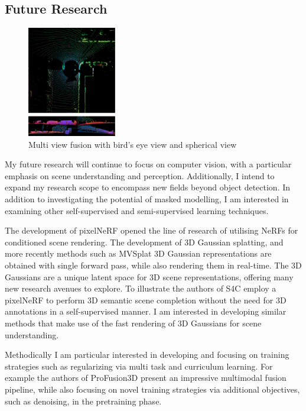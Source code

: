 \subsection{\textbf{Future Research}}
\begin{figure}
    \includegraphics[width=110pt]{pic/fusion.png}
    \mainfont\fontsize{9pt}{9pt}\selectfont\caption{ \mainfont\fontsize{9pt}{9pt}\selectfont Multi view fusion with bird's eye view and spherical view}
    \label{fig:fusion}
    \end{figure}
My future research will continue to focus on computer vision, with a particular emphasis on scene understanding and perception. Additionally, I intend to expand my research scope to encompass new fields beyond object detection. In addition to investigating the potential of masked modelling, I am interested in examining other self-supervised and semi-supervised learning techniques. 

The development of pixelNeRF \cite{pixelnerf} opened the line of research of utilising NeRFs for conditioned scene rendering. The development of 3D Gaussian splatting, and more recently methods such as MVSplat \cite{mvsplat} 3D Gaussian representations are obtained with single forward pass, while also rendering them in real-time. The 3D Gaussians are a unique latent space for 3D scene representations, offering many new research avenues to explore. To illustrate the authors of S4C \cite{s4c} employ a pixelNeRF to perform 3D semantic scene completion without the need for 3D annotations in a self-supervised manner. I am interested in developing similar methods that make use of the fast rendering of 3D Gaussians for scene understanding.

Methodically I am particular interested in developing and focusing on training strategies such as regularizing via multi task and curriculum learning. For example the authors of ProFusion3D \cite{valada} present an impressive multimodal fusion pipeline, while also focusing on novel training strategies via additional objectives, such as denoising, in the pretraining phase. 